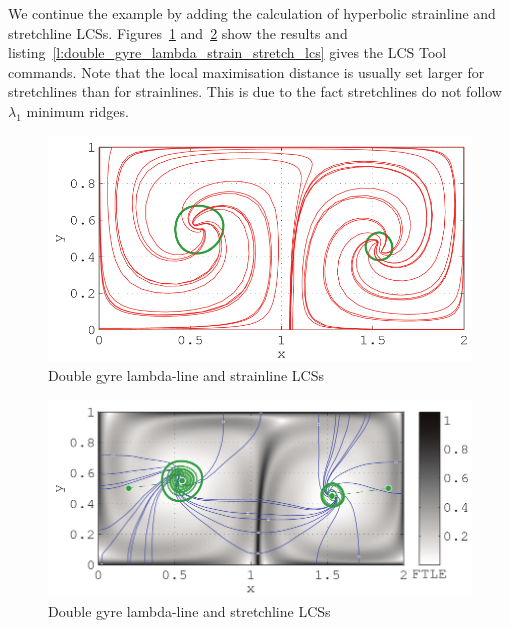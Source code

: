\documentclass{article}
\begin{document}
We continue the example by adding the calculation of hyperbolic strainline and stretchline LCSs. Figures~\ref{fig:double_gyre_lambda_strain_lcs} and~\ref{fig:double_gyre_lambda_stretch_lcs} show the results and listing~\ref{l:double_gyre_lambda_strain_stretch_lcs} gives the LCS Tool commands. Note that the local maximisation distance is usually set larger for stretchlines than for strainlines. This is due to the fact stretchlines do not follow $\lambda_1$ minimum ridges.

\begin{figure}
  \centering
  \includegraphics[width=\textwidth]{graphics/double_gyre/lambda_strain_lcs}
  \caption{Double gyre lambda-line and strainline LCSs}
  \label{fig:double_gyre_lambda_strain_lcs}
\end{figure}

\begin{figure}
  \centering
  \includegraphics[width=\textwidth]{graphics/double_gyre/lambda_stretch_lcs}
  \caption{Double gyre lambda-line and stretchline LCSs}
  \label{fig:double_gyre_lambda_stretch_lcs}
\end{figure}


\end{document}
